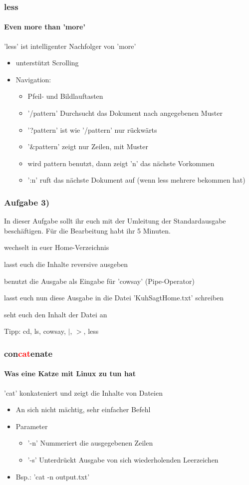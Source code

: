 \documentclass[12pt,utf8, handout]{beamer}
\begin{document}
\begin{frame}
\frametitle{less}
\framesubtitle{\textcolor{ownDarkOr}{Even more than 'more'}}
'less' ist intelligenter Nachfolger von 'more'
\begin{itemize}
	\item unterstützt Scrolling
	\item Navigation:
	\begin{itemize}[<+->]
		\item Pfeil- und Bildlauftasten
		\item '/pattern' Durchsucht das Dokument nach angegebenen Muster
		\item '?pattern' ist wie '/pattern' nur rückwärts
		\item '$\&$pattern' zeigt nur Zeilen, mit Muster
		\item wird pattern benutzt, dann zeigt 'n' das nächste Vorkommen
		\item ':n' ruft das nächste Dokument auf (wenn less mehrere bekommen hat)
	\end{itemize}
\end{itemize}
\end{frame}

\begin{frame}
\frametitle{Aufgabe 3)}
In dieser Aufgabe sollt ihr euch mit der Umleitung der Standardausgabe beschäftigen. Für die Bearbeitung habt ihr 5 Minuten.
\begin{itemize}
	{\footnotesize
	\item wechselt in euer Home-Verzeichnis
	\item lasst euch die Inhalte reversive ausgeben
	\item benutzt die Ausgabe als Eingabe für 'cowsay' (Pipe-Operator)
	\item lasst euch nun diese Ausgabe in die Datei 'KuhSagtHome.txt' schreiben
	\item seht euch den Inhalt der Datei an
	}
\end{itemize}
{\scriptsize Tipp: cd, ls, cowsay, $\mid$, $>$, less}
\end{frame}

\begin{frame}
\frametitle{con\textcolor{red}{cat}enate}
\framesubtitle{\textcolor{ownDarkOr}{Was eine Katze mit Linux zu tun hat}}
'cat' konkateniert und zeigt die Inhalte von Dateien
\begin{itemize}[<+->]
	\item An sich nicht mächtig, sehr einfacher Befehl
	\item Parameter
	\begin{itemize}
		\item '-n' Nummeriert die ausgegebenen Zeilen 
		\item '-s' Unterdrückt Ausgabe von sich wiederholenden Leerzeichen
	\end{itemize}
	\item Bsp.: 'cat -n output.txt'
\end{itemize}
\end{frame}
\end{document}
